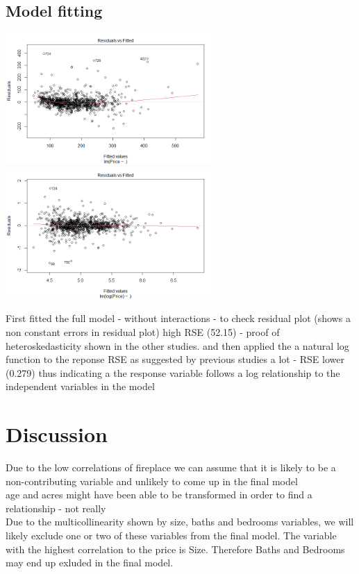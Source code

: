 \documentclass[10pt,A4,makeidx]{article}
\begin{document}
  \subsection{Model fitting}
  \begin{center}
    \includegraphics[width=8cm]{full-res.png}
    \includegraphics[width=8cm]{full-resln.png}
  \end{center}
  First fitted the full model - without interactions - to check residual plot
  (shows a non constant errors in residual plot) high RSE (52.15) - proof of 
  heteroskedasticity shown in the other studies.
  and then applied the  a natural log function to the reponse RSE as suggested by
  previous studies a lot - RSE lower (0.279) thus indicating a the response variable
  follows a log relationship to the independent variables in the model
\section{Discussion}
  Due to the low correlations of fireplace we can assume that it is likely to be
  a non-contributing variable and unlikely to come up in the final model\\
  

age and acres might have been able to be transformed in order to find a relationship - not really\\

  Due to the multicollinearity shown by size, baths and bedrooms variables, we will
  likely exclude one or two of these variables from the final model. The variable
  with the highest correlation to the price is Size. Therefore Baths and Bedrooms
  may end up exluded in the final model. \\
  
\end{document}

